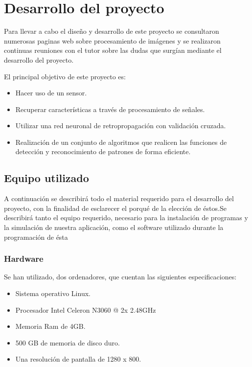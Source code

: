 \newpage
\section{Desarrollo del proyecto}

Para  llevar  a  cabo  el  diseño  y  desarrollo  de  este  proyecto  se  consultaron numerosas  paginas web sobre procesamiento de imágenes y  se  realizaron continuas reuniones con el tutor sobre las dudas que surgían mediante el desarrollo del proyecto.

El principal objetivo de este proyecto es:

\begin{itemize}
\item Hacer uso de un sensor.
\item Recuperar características a través de procesamiento de señales.
\item Utilizar una red neuronal de retropropagación con validación cruzada.
\item Realización de un conjunto de  algoritmos  que  realicen  las  funciones  de  detección  y  reconocimiento  de  patrones de forma eficiente.
\end{itemize}

\subsection{Equipo utilizado}
A continuación se describirá todo  el  material  requerido  para  el  desarrollo  del proyecto, con la finalidad de esclarecer el porqué de la elección de éstos.Se
describirá tanto  el  equipo requerido,  necesario  para  la  instalación  de  programas  y la  simulación de nuestra aplicación, como el software utilizado durante la programación de ésta
\subsubsection{Hardware}
Se han utilizado, dos ordenadores, que cuentan las siguientes especificaciones:
\begin{itemize}
\item Sistema operativo Linux.
\item Procesador Intel Celeron N3060 @ 2x 2.48GHz
\item Memoria Ram de 4GB.
\item 500 GB de memoria de disco duro.
\item Una resolución de pantalla de 1280 x 800.
\end{itemize}

